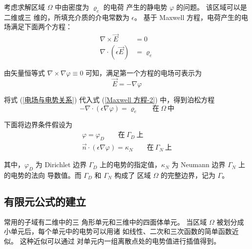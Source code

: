 \par 考虑求解区域 $\Omega$ 中由密度为 $\varrho_e$ 的电荷
产生的静电势 $\varphi$ 的问题。 
该区域可以是二维或三
维的，所填充介质的介电常数为 $\epsilon$。
基于 Maxwell 方程，电荷产生的电场满足下面两个方程：
\begin{align}
    \label{Maxwell 方程-1}
    \nabla\times\vec{E}&=0\\
    \label{Maxwell 方程-2}
    \nabla\cdot(\epsilon \vec{E})&=\varrho_e
\end{align}

\par 由矢量恒等式 $\nabla\times\nabla \varphi\equiv 0$ 可知，满足第一个方程的电场可表示为
\begin{equation}
    \vec{E}=-\nabla\varphi
    \label{电场与电势关系}
\end{equation}
\par 将式 (\ref{电场与电势关系}) 代入式 (\ref{Maxwell 方程-2}) 中，得到泊松方程
\begin{equation}
    -\nabla\cdot(\epsilon\nabla\varphi)=\varrho_e
    \qquad \text{在}\ \Omega\ \text{中}
    \label{泊松方程}
\end{equation}
\par 下面将边界条件假设为
\begin{align}
    \label{标量场边界条件-1}
    \varphi=\varphi_D\qquad \text{在}\ \Gamma_D\ \text{上}\\
    \label{标量场边界条件-2}
    \vec{n}\cdot(\epsilon\nabla\varphi)=\kappa_N\qquad \text{在}\ \Gamma_N\ \text{上}
\end{align}
\par 其中，$\varphi_D$ 为 Dirichlet 边界 
$\Gamma_D$ 上的电势的指定值，$\kappa_N$ 
为 Neumann 边界 $\Gamma_N$ 上的电势的法向
导数值。而 $\Gamma_D$ 和 $\Gamma_N$ 构成了
区域 $\Omega$ 的完整边界，记为 $\Gamma$。

\subsection{有限元公式的建立}

\par 常用的子域有二维中的三
角形单元和三维中的四面体单元。
当区域 $\Omega$ 被划分成小单元后，每个单元中的电势可以用诸
如线性、二次和三次函数的简单函数近似。
这种近似可以通过
对单元内一组离散点处的电势值进行插值得到。

